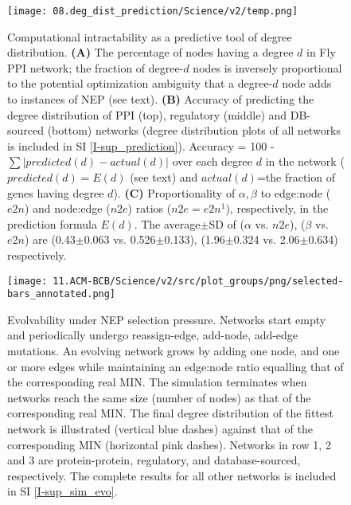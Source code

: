 \begin{figure}[H]%
        \centering
        \texttt{[image: 08.deg\_dist\_prediction/Science/v2/temp.png]}
        \caption{
            Computational intractability as a predictive tool of degree distribution. \textbf{(A)} The percentage of nodes having a degree $d$ in Fly PPI network; the fraction of degree-$d$ nodes is inversely proportional to the potential optimization ambiguity that a degree-$d$ node adds to instances of NEP (see text). \textbf{(B)} Accuracy of predicting the degree distribution of PPI (top), regulatory (middle) and DB-sourced (bottom) networks (degree distribution plots of all networks is included in SI \ref{I-sup_prediction}).  Accuracy = 100 - $\sum |predicted(d)-actual(d)|$ over each degree $d$ in the network ($predicted(d)=E(d)$ (see text) and $actual(d)$=the fraction of genes having degree $d$). \textbf{(C)} Proportionality of $\alpha, \beta$   to edge:node ($e2n$) and node:edge ($n2e$) ratios ($n2e=e2n^1$), respectively, in the prediction formula $E(d)$. The average$\pm$SD  of ($\alpha$ vs. $n2e$), ($\beta$ vs. $e2n$) are (0.43$\pm$0.063 vs. 0.526$\pm$0.133), (1.96$\pm$0.324 vs. 2.06$\pm$0.634) respectively.  }
        \label{predict_figure}
        \label{ambig}
\end{figure}


\begin{figure}[H]%
    \centering
    \texttt{[image: 11.ACM-BCB/Science/v2/src/plot\_groups/png/selected-bars\_annotated.png]}%

    \caption{
        Evolvability under NEP selection pressure. Networks start empty and periodically undergo reassign-edge, add-node, add-edge mutations. An evolving network grows by adding one node, and one or more edges while maintaining an edge:node ratio equalling that of the corresponding real MIN. The simulation terminates when networks reach the same size (number of nodes) as that of the corresponding real MIN. The final degree distribution of the fittest network is illustrated (vertical blue dashes) against that of the corresponding MIN (horizontal pink dashes). Networks in row 1, 2 and 3 are protein-protein, regulatory, and database-sourced, respectively. The complete results for all other networks is included in SI \ref{I-sup_sim_evo}.
    }
    \label{evol_figure}
\end{figure}

\newpage
